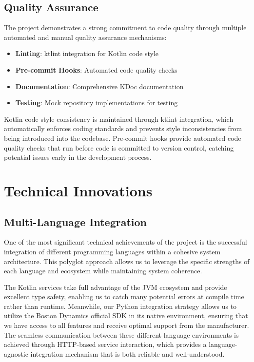 \documentclass[runningheads]{llncs}
\begin{document}
%
%
%
\subsection{Quality Assurance}

The project demonstrates a strong commitment to code quality through multiple automated and manual quality assurance mechanisms:

\begin{itemize}
    \item \textbf{Linting}: ktlint integration for Kotlin code style
    \item \textbf{Pre-commit Hooks}: Automated code quality checks
    \item \textbf{Documentation}: Comprehensive KDoc documentation
    \item \textbf{Testing}: Mock repository implementations for testing
\end{itemize}

Kotlin code style consistency is maintained through ktlint integration, which automatically enforces coding standards and prevents style inconsistencies from being introduced into the codebase. Pre-commit hooks provide automated code quality checks that run before code is committed to version control, catching potential issues early in the development process.

%
%
%
\section{Technical Innovations}

%
%
%
\subsection{Multi-Language Integration}

One of the most significant technical achievements of the project is the successful integration of different programming languages within a cohesive system architecture. This polyglot approach allows us to leverage the specific strengths of each language and ecosystem while maintaining system coherence.

The Kotlin services take full advantage of the JVM ecosystem and provide excellent type safety, enabling us to catch many potential errors at compile time rather than runtime. Meanwhile, our Python integration strategy allows us to utilize the Boston Dynamics official SDK in its native environment, ensuring that we have access to all features and receive optimal support from the manufacturer. The seamless communication between these different language environments is achieved through HTTP-based service interaction, which provides a language-agnostic integration mechanism that is both reliable and well-understood.
\end{document}
